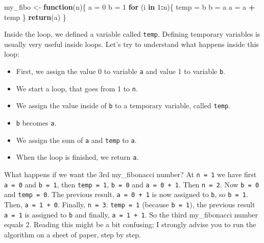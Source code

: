 \documentclass[]{gitbook}
\newenvironment{Shaded}{\begin{snugshade}}{\end{snugshade}}
\newcommand{\ControlFlowTok}[1]{\textcolor[rgb]{0.13,0.29,0.53}{\textbf{#1}}}
\newcommand{\DecValTok}[1]{\textcolor[rgb]{0.00,0.00,0.81}{#1}}
\newcommand{\KeywordTok}[1]{\textcolor[rgb]{0.13,0.29,0.53}{\textbf{#1}}}
\newcommand{\NormalTok}[1]{#1}
\newcommand{\OperatorTok}[1]{\textcolor[rgb]{0.81,0.36,0.00}{\textbf{#1}}}
\newcommand{\StringTok}[1]{\textcolor[rgb]{0.31,0.60,0.02}{#1}}
\providecommand{\tightlist}{%
  \setlength{\itemsep}{0pt}\setlength{\parskip}{0pt}}
\theoremstyle{definition}
\theoremstyle{definition}
\theoremstyle{definition}
\theoremstyle{remark}
\begin{document}
\begin{Shaded}
\begin{Highlighting}[]
\NormalTok{my_fibo <-}\StringTok{ }\ControlFlowTok{function}\NormalTok{(n)\{}
\NormalTok{ a =}\StringTok{ }\DecValTok{0}
\NormalTok{ b =}\StringTok{ }\DecValTok{1}
 \ControlFlowTok{for}\NormalTok{ (i }\ControlFlowTok{in} \DecValTok{1}\OperatorTok{:}\NormalTok{n)\{}
\NormalTok{  temp =}\StringTok{ }\NormalTok{b}
\NormalTok{  b =}\StringTok{ }\NormalTok{a}
\NormalTok{  a =}\StringTok{ }\NormalTok{a }\OperatorTok{+}\StringTok{ }\NormalTok{temp}
\NormalTok{ \}}
 \KeywordTok{return}\NormalTok{(a)}
\NormalTok{\}}
\end{Highlighting}
\end{Shaded}

Inside the loop, we defined a variable called \texttt{temp}. Defining
temporary variables is usually very useful inside loops. Let's try to
understand what happens inside this loop:

\begin{itemize}
\tightlist
\item
  First, we assign the value 0 to variable \texttt{a} and value 1 to
  variable \texttt{b}.
\item
  We start a loop, that goes from 1 to \texttt{n}.
\item
  We assign the value inside of \texttt{b} to a temporary variable,
  called \texttt{temp}.
\item
  \texttt{b} becomes \texttt{a}.
\item
  We assign the sum of \texttt{a} and \texttt{temp} to \texttt{a}.
\item
  When the loop is finished, we return \texttt{a}.
\end{itemize}

What happens if we want the 3rd my\_fibonacci number? At
\texttt{n\ =\ 1} we have first \texttt{a\ =\ 0} and \texttt{b\ =\ 1},
then \texttt{temp\ =\ 1}, \texttt{b\ =\ 0} and \texttt{a\ =\ 0\ +\ 1}.
Then \texttt{n\ =\ 2}. Now \texttt{b\ =\ 0} and \texttt{temp\ =\ 0}. The
previous result, \texttt{a\ =\ 0\ +\ 1} is now assigned to \texttt{b},
so \texttt{b\ =\ 1}. Then, \texttt{a\ =\ 1\ +\ 0}. Finally,
\texttt{n\ =\ 3}. \texttt{temp\ =\ 1} (because \texttt{b\ =\ 1}), the
previous result \texttt{a\ =\ 1} is assigned to \texttt{b} and finally,
\texttt{a\ =\ 1\ +\ 1}. So the third my\_fibonacci number equals 2.
Reading this might be a bit confusing; I strongly advise you to run the
algorithm on a sheet of paper, step by step.
\end{document}
